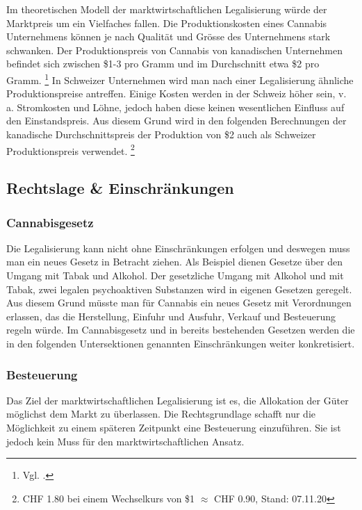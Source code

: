 \documentclass[../main.tex]{subfiles}
\begin{document}
	 \noindent
	 Im theoretischen Modell der marktwirtschaftlichen Legalisierung würde der Marktpreis um ein Vielfaches fallen.
	 Die Produktionskosten eines Cannabis Unternehmens können je nach Qualität und Grösse des Unternehmens stark schwanken.
	 Der Produktionspreis von Cannabis von kanadischen Unternehmen befindet sich zwischen \$1-3 pro Gramm und im Durchschnitt etwa \$2 pro Gramm.%
	 \footnote{Vgl. \cite{seekingalpha-01}.}
	 In Schweizer Unternehmen wird man nach einer Legalisierung ähnliche Produktionspreise antreffen. 
	 Einige Kosten werden in der Schweiz höher sein, v. a. Stromkosten und Löhne, jedoch haben diese keinen wesentlichen Einfluss auf den Einstandspreis.
	 Aus diesem Grund wird in den folgenden Berechnungen der kanadische Durchschnittspreis der Produktion von \$2 auch als Schweizer Produktionspreis verwendet.%
	 \footnote{CHF 1.80 bei einem Wechselkurs von \$1 $\approx$ CHF 0.90, Stand: 07.11.20}%
	 

	 \pagebreak	 
	 
	 \subsection{Rechtslage \& Einschränkungen}
	 
	 \subsubsection{Cannabisgesetz}
	 Die Legalisierung kann nicht ohne Einschränkungen erfolgen und deswegen muss man ein neues Gesetz in Betracht ziehen.
	 Als Beispiel dienen Gesetze über den Umgang mit Tabak und Alkohol.
	 Der gesetzliche Umgang mit Alkohol und mit Tabak, zwei legalen psychoaktiven Substanzen wird in eigenen Gesetzen geregelt. 
	 Aus diesem Grund müsste man für Cannabis ein neues Gesetz mit Verordnungen erlassen, das die Herstellung, Einfuhr und Ausfuhr, Verkauf und Besteuerung regeln würde.	 
	 Im Cannabisgesetz und in bereits bestehenden Gesetzen werden die in den folgenden Untersektionen genannten Einschränkungen weiter konkretisiert.
	 
	 \subsubsection{Besteuerung}
	 Das Ziel der marktwirtschaftlichen Legalisierung ist es, die Allokation der Güter möglichst dem Markt zu überlassen.
	 Die Rechtsgrundlage schafft nur die Möglichkeit zu einem späteren Zeitpunkt eine Besteuerung einzuführen. 
	 Sie ist jedoch kein Muss für den marktwirtschaftlichen Ansatz.\\
	 
\end{document}
